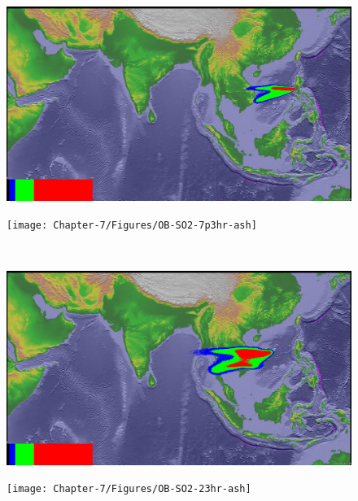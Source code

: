 \begin{figure}[!htb]
    \centering
    \begin{minipage}{.325\textwidth}
        \centering
        \includegraphics[width=0.99 \textwidth]{Chapter-7/Figures/SPH-Plume-7p3hr-ash}
    \end{minipage}%
    \begin{minipage}{.325 \textwidth}
        \centering
        \texttt{[image: Chapter-7/Figures/OB-SO2-7p3hr-ash]}
    \end{minipage}%
    \\
    \begin{minipage}{.325\textwidth}
        \centering
        \includegraphics[width=0.99 \textwidth]{Chapter-7/Figures/SPH-Plume-23hr-ash}
    \end{minipage}%
    \begin{minipage}{.325 \textwidth}
        \centering
        \texttt{[image: Chapter-7/Figures/OB-SO2-23hr-ash]}
    \end{minipage}%
    \\
    \begin{minipage}{.325\textwidth}
        \centering

\end{minipage}
\end{figure}
